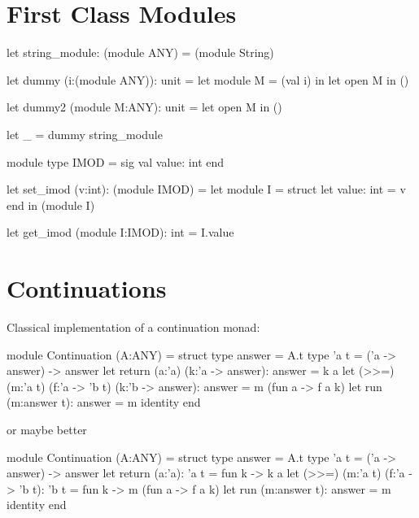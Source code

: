 \section{First Class Modules}


\begin{ocaml}
  let string_module: (module ANY) = (module String)

  let dummy (i:(module ANY)): unit =
    let module M = (val i) in
    let open M in
    ()

  let dummy2 (module M:ANY): unit =
    let open M in
    ()

  let _ = dummy string_module
\end{ocaml}


\begin{ocaml}
  module type IMOD =
    sig
      val value: int
    end

  let set_imod (v:int): (module IMOD) =
    let module I =
      struct
        let value: int = v
      end in
    (module I)

  let get_imod (module I:IMOD): int =
    I.value
\end{ocaml}





\section{Continuations}

Classical implementation of a continuation monad:
%
\begin{ocaml}
  module Continuation (A:ANY) =
  struct
    type answer = A.t
    type 'a t = ('a -> answer) -> answer
    let return (a:'a) (k:'a -> answer): answer =
      k a
    let (>>=) (m:'a t) (f:'a -> 'b t) (k:'b -> answer): answer =
      m (fun a -> f a k)
    let run (m:answer t): answer =
       m identity
  end
\end{ocaml}
%
or maybe better
\begin{ocaml}
  module Continuation (A:ANY) =
  struct
    type answer = A.t
    type 'a t = ('a -> answer) -> answer
    let return (a:'a): 'a t =
      fun k -> k a
    let (>>=) (m:'a t) (f:'a -> 'b t): 'b t =
      fun k -> m (fun a -> f a k)
    let run (m:answer t): answer =
       m identity
  end
\end{ocaml}

